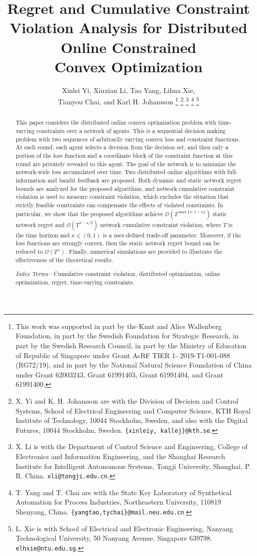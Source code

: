 \documentclass[12pt,draftcls,onecolumn]{IEEEtran}%
\title{\LARGE \bf Regret and Cumulative Constraint Violation Analysis for Distributed Online Constrained\\ Convex Optimization
}
\author{Xinlei Yi, Xiuxian Li, Tao Yang, Lihua Xie,\\ Tianyou Chai, and Karl H. Johansson%
	\thanks{This work was supported in part by the Knut and Alice Wallenberg Foundation, in part by the  Swedish Foundation for Strategic Research, in part by the Swedish Research Council, in part by the Ministry of Education of Republic of Singapore under Grant AcRF TIER 1- 2019-T1-001-088 (RG72/19), and in part by the National Natural Science Foundation of China under Grant 62003243, Grant 61991403, Grant 61991404, and Grant 61991400.}
	\thanks{X. Yi and K. H. Johansson are with the Division of Decision and Control Systems, School of Electrical Engineering and Computer Science, KTH Royal Institute of Technology, 10044 Stockholm, Sweden, and also with the Digital Futures, 10044 Stockholm, Sweden.
		{\tt\small \{xinleiy, kallej\}@kth.se}.}%
	\thanks{X. Li is with the Department of Control Science and Engineering, College of Electronics and Information Engineering, and the Shanghai Research Institute for Intelligent Autonomous Systems, Tongji University, Shanghai, P. R. China. {\tt\small xli@tongji.edu.cn}.}
	\thanks{T. Yang and T. Chai are with the State Key Laboratory of Synthetical Automation for Process Industries, Northeastern University, 110819 Shenyang, China. {\tt\small \{yangtao,tychai\}@mail.neu.edu.cn}.}
	\thanks{L. Xie is with School of Electrical and Electronic Engineering,
		Nanyang Technological University, 50 Nanyang Avenue, Singapore 639798. {\tt\small elhxie@ntu.edu.sg}.}
}
\begin{document}
\maketitle
\thispagestyle{plain}
\pagestyle{plain}



\begin{abstract}\label{online_op:Abstract}
This paper considers the distributed online convex optimization problem with time-varying constraints over a network of agents. This is a sequential decision making problem with two sequences of arbitrarily varying convex loss and constraint functions. At each round, each agent selects a decision from  the decision set, and then only a portion of the loss function and a coordinate block of the constraint function at this round are privately revealed to this agent. The goal of the network is to minimize the network-wide loss accumulated over time. Two distributed online algorithms with full-information and bandit feedback are proposed. Both dynamic and static network regret bounds are analyzed for the proposed algorithms, and network cumulative constraint violation is used to measure constraint violation, which excludes the situation that strictly feasible constraints can compensate the effects of violated constraints. In particular, we show that the proposed algorithms achieve $\mathcal{O}(T^{\max\{\kappa,1-\kappa\}})$ static network regret and $\mathcal{O}(T^{1-\kappa/2})$ network cumulative constraint violation, where $T$ is the time horizon and $\kappa\in(0,1)$ is a user-defined trade-off parameter. Moreover, if the loss functions are strongly convex, then the static network regret bound can be reduced to $\mathcal{O}(T^{\kappa})$.  Finally, numerical simulations are provided to illustrate the effectiveness of the theoretical results.

\emph{Index Terms}---Cumulative constraint violation, distributed optimization, online optimization, regret, time-varying constraints.
\end{abstract}
\end{document}

